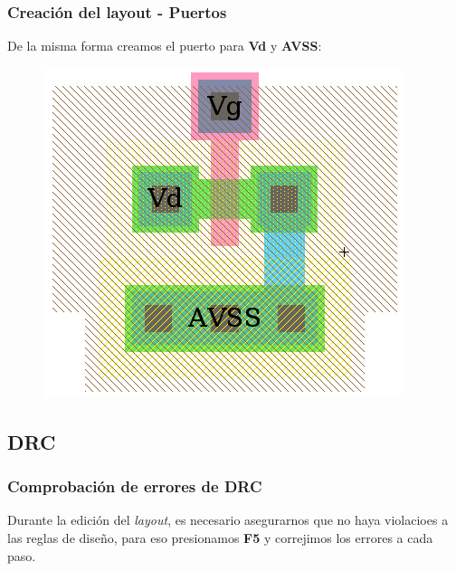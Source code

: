 \documentclass{beamer}
\begin{document}
\begin{frame}
\frametitle{Creación del layout - Puertos}
De la misma forma creamos el puerto para \textbf{Vd} y \textbf{AVSS}:
\begin{figure}
  \includegraphics[width=0.51\linewidth]{figuras/edicionElectric-11a.png}
\end{figure}
\end{frame}
\subsection{DRC}
\begin{frame}
\frametitle{Comprobación de errores de DRC}
Durante la edición del \emph{layout}, es necesario asegurarnos que no haya violacioes a las reglas de diseño, para eso presionamos \textbf{F5} y correjimos los errores a cada paso.
\end{frame}
\end{document}
